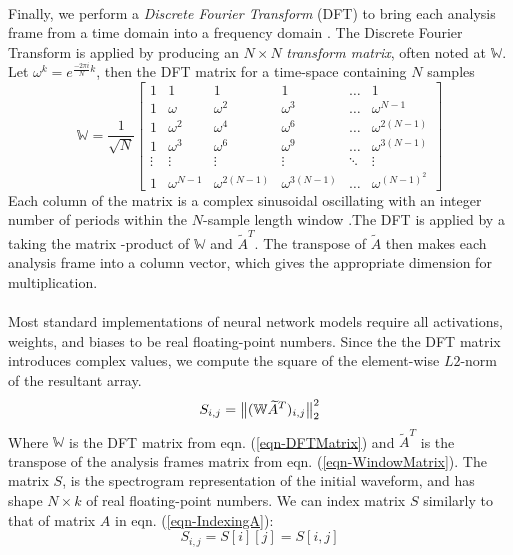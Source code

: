 \documentclass[12pt,letterpaper]{article}
\begin{document}
\paragraph*{}Finally, we perform a \textit{Discrete Fourier Transform} (DFT) to bring each analysis frame from a time domain into a frequency domain \cite{Olson,Peatross}. The Discrete Fourier Transform is applied by producing an $N \times N$ \textit{transform matrix}, often noted at $\mathbb{W}$. Let $\omega^k = e^{\frac{-2\pi i}{N}k}$, then the DFT matrix for a time-space containing $N$ samples
\begin{equation}
\label{eqn-DFTMatrix}
\mathbb{W} = \frac{1}{\sqrt{N}}
\begin{bmatrix}
1 & 1 & 1 & 1 & \hdots & 1 \\
1 & \omega		& \omega^2 & \omega^3 & \hdots & \omega^{N-1} \\
1 & \omega^2	& \omega^4 & \omega^6 & \hdots & \omega^{2(N-1)} \\
1 & \omega^3	& \omega^6 & \omega^9 & \hdots & \omega^{3(N-1)} \\
\vdots & \vdots & \vdots & \vdots & \ddots & \vdots \\
1 & \omega^{N-1} & \omega^{2(N-1)} & \omega^{3(N-1)} & \hdots & \omega^{(N-1)^2}
\end{bmatrix}
\end{equation}
Each column of the matrix is a complex sinusoidal oscillating with an integer number of periods within the $N$-sample length window \cite{Short,Peatross}.The DFT is applied by a taking the matrix -product of $\mathbb{W}$ and $\widetilde{A}^T$. The transpose of $\widetilde{A}$ then makes each analysis frame into a column vector, which gives the appropriate dimension for multiplication.

\paragraph*{}Most standard implementations of neural network models require all activations, weights, and biases to be real floating-point numbers. Since the the DFT matrix introduces complex values, we compute the square of the element-wise $L2$-norm of the resultant array.
\begin{equation}
\label{eqn-Spectrogram}
S_{i,j} = \big{\lVert} (\mathbb{W}\widetilde{A}^T)_{i,j} \big{\rVert}_{2}^{2}
\end{equation}
Where $\mathbb{W}$ is the DFT matrix from eqn. (\ref{eqn-DFTMatrix}) and $\widetilde{A}^T$ is the transpose of the analysis frames matrix from eqn. (\ref{eqn-WindowMatrix}). The matrix $S$, is the spectrogram representation of the initial waveform, and has shape $N \times k$ of real floating-point numbers. We can index matrix $S$ similarly to that of matrix $A$ in eqn. (\ref{eqn-IndexingA}):
\begin{equation}
\label{eqn-IndexingS}
S_{i,j} = S[i][j] = S[i,j]
\end{equation}
\end{document}
